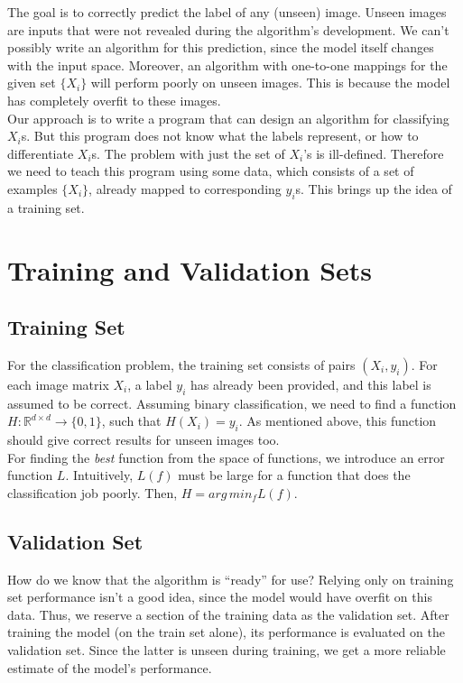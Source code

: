 \documentclass[12pt]{article}
\begin{document}
\noindent The goal is to correctly predict the label of any (unseen) image. Unseen images are inputs that were not revealed during the algorithm's development. We can't possibly write an algorithm for this prediction, since the model itself changes with the input space. Moreover, an algorithm with one-to-one mappings for the given set $\{X_i\}$ will perform poorly on unseen images. This is because the model has completely overfit to these images.
\\

\noindent Our approach is to write a program that can design an algorithm for classifying $X_i$s. But this program does not know what the labels represent, or how to differentiate $X_i$s. The problem with just the set of $X_i$'s is ill-defined. Therefore we need to teach this program using some data, which consists of a set of examples $\{X_i\}$, already mapped to corresponding $y_i$s. This brings up the idea of a training set.

\section{Training and Validation Sets}


\subsection{Training Set}
For the classification problem, the training set consists of pairs $(X_i,y_i)$. For each image matrix $X_i$, a label $y_i$ has already been provided, and this label is assumed to be correct. Assuming binary classification, we need to find a function $H : \mathbb{R}^{d\times d} \to \{0,1\}$, such that $H(X_i)=y_i$. As mentioned above, this function should give correct results for unseen images too.
\\

\noindent For finding the {\it best} function from the space of functions, we introduce an error function $L$. Intuitively, $L(f)$ must be large for a function that does the classification job poorly. Then, $H = arg\,min_f L(f)$.

\subsection{Validation Set}
How do we know that the algorithm is ``ready'' for use? Relying only on training set performance isn't a good idea, since the model would have overfit on this data. Thus, we reserve a section of the training data as the validation set. After training the model (on the train set alone), its performance is evaluated on the validation set. Since the latter is unseen during training, we get a more reliable estimate of the model's performance.
\end{document}

